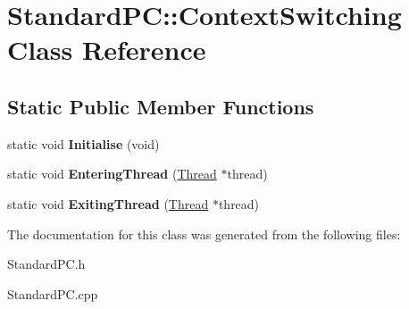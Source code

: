 \hypertarget{class_standard_p_c_1_1_context_switching}{}\section{Standard\+PC\+:\+:Context\+Switching Class Reference}
\label{class_standard_p_c_1_1_context_switching}
\subsection*{Static Public Member Functions}
\begin{DoxyCompactItemize}
\item 
\mbox{\label{class_standard_p_c_1_1_context_switching_a916007a6599959c46cac1e126fdd7a32}} 
static void {\bfseries Initialise} (void)
\item 
\mbox{\label{class_standard_p_c_1_1_context_switching_a9840f6fcfa04c78a1bd71e9a4ebd0e39}} 
static void {\bfseries Entering\+Thread} (\hyperlink{class_thread}{Thread} $\ast$thread)
\item 
\mbox{\label{class_standard_p_c_1_1_context_switching_a20e90a2068057fd8af6cddbbd6420577}} 
static void {\bfseries Exiting\+Thread} (\hyperlink{class_thread}{Thread} $\ast$thread)
\end{DoxyCompactItemize}


The documentation for this class was generated from the following files\+:\begin{DoxyCompactItemize}
\item 
Standard\+P\+C.\+h\item 
Standard\+P\+C.\+cpp\end{DoxyCompactItemize}
